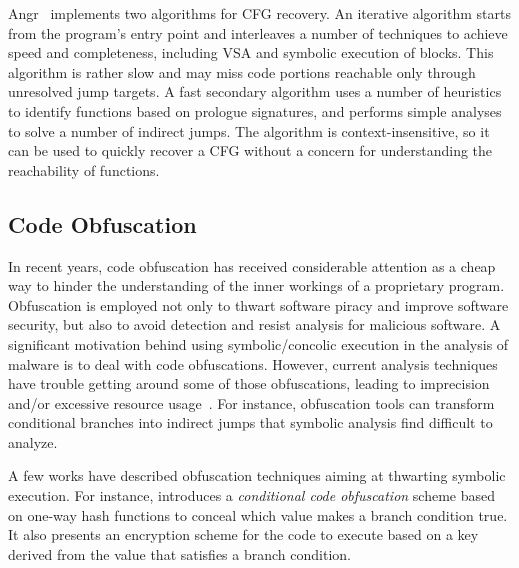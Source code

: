 {\sc Angr}~\cite{ANGR-SSP16} implements two algorithms for CFG recovery. An iterative algorithm starts from the program's entry point and interleaves a number of techniques to achieve speed and completeness, including VSA and symbolic execution of blocks. This algorithm is rather slow and may miss code portions reachable only through unresolved jump targets. A fast secondary algorithm  uses a number of heuristics to identify functions based on prologue signatures, and performs simple analyses to solve a number of indirect jumps. The algorithm is context-insensitive, so it can be used to quickly recover a CFG without a concern for understanding the reachability of functions.%

\subsection{Code Obfuscation}
In recent years, code obfuscation has received considerable attention as a cheap way to hinder the understanding of the inner workings of a proprietary program. Obfuscation is employed not only to thwart software piracy and improve software security, but also to avoid detection and resist analysis for malicious software. A significant motivation behind using symbolic/concolic execution in the analysis of malware is to deal with code obfuscations. However, current analysis techniques have trouble getting around some of those obfuscations, leading to imprecision and/or excessive resource usage~\cite{YD-CCS15}. For instance, obfuscation tools can transform conditional branches into indirect jumps that symbolic analysis find difficult to analyze. %

A few works have described obfuscation techniques aiming at thwarting symbolic execution. For instance, \cite{SLG-NDSS08} introduces a {\em conditional code obfuscation} scheme based on one-way hash functions to conceal which value makes a branch condition true. It also presents an encryption scheme for the code to execute based on a key derived from the value that satisfies a branch condition. %


